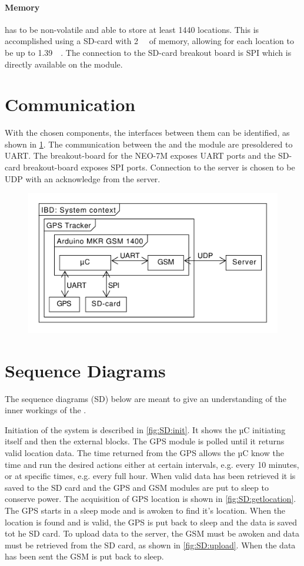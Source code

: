 \paragraph{Memory} has to be non-volatile and able to store at least 1440 locations.
This is accomplished using a SD-card with \SI{2}{\giga\byte} of memory, allowing for each location to be up to \SI{1.39}{\mega\byte}.
The connection to the SD-card breakout board is SPI which is directly available on the \MKR module.

\section{Communication}
With the chosen components, the interfaces between them can be identified, as shown in \cref{fig:IBD:overall}.
The communication between the \SAMD and the \SARA module are presoldered to UART.
The breakout-board for the NEO-7M exposes UART ports and the SD-card breakout-board exposes SPI ports.
Connection to the server is chosen to be UDP with an acknowledge from the server.

\begin{figure}
	\centering
	\includegraphics[width=0.7\linewidth]{gfx/Design/Overall_IBD.pdf}
	\caption{}
	\label{fig:IBD:overall}
\end{figure}

\section{Sequence Diagrams}
The sequence diagrams (SD) below are meant to give an understanding of the inner workings of the \systemName.

Initiation of the system is described in \cref{fig:SD:init}.
It shows the µC initiating itself and then the external blocks.
The GPS module is polled until it returns valid location data. The time returned from the GPS allows the µC know the time and run the desired actions either at certain intervals, e.g. every 10 minutes, or at specific times, e.g. every full hour.
When valid data has been retrieved it is saved to the SD card and the GPS and GSM modules are put to sleep to conserve power.
The acquisition of GPS location is shown in \cref{fig:SD:getlocation}.
The GPS starts in a sleep mode and is awoken to find it's location.
When the location is found and is valid, the GPS is put back to sleep and the data is saved tot he SD card.
To upload data to the server, the GSM must be awoken and data must be retrieved from the SD card, as shown in \cref{fig:SD:upload}.
When the data has been sent the GSM is put back to sleep.

